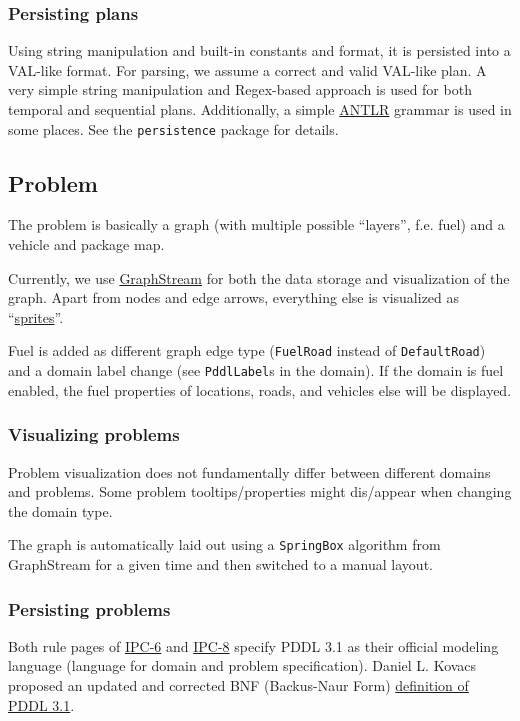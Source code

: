 \subsubsection*{Persisting plans}
Using string manipulation and built-in constants and format, it is persisted into a VAL-like format.
For parsing, we assume a correct and valid VAL-like plan. A very simple string manipulation and Regex-based approach
is used for both temporal and sequential plans. Additionally, a simple \href{http://www.antlr.org/}{ANTLR} grammar
is used in some places. See the \texttt{persistence} package for details.

\subsection*{Problem}
The problem is basically a graph (with multiple possible ``layers'', f.e. fuel) and a vehicle and package map.

Currently, we use \href{http://graphstream-project.org/}{GraphStream} for both the data storage and visualization of the graph.
Apart from nodes and edge arrows, everything else is visualized as
``\href{http://graphstream-project.org/doc/Tutorials/Graph-Visualisation/#sprites}{sprites}''.

Fuel is added as different graph edge type (\verb+FuelRoad+ instead of \verb+DefaultRoad+) and a domain label change
(see \verb+PddlLabel+s in the domain).
If the domain is fuel enabled, the fuel properties of locations, roads, and vehicles else will be displayed.

\subsubsection*{Visualizing problems}

Problem visualization does not fundamentally differ between different domains and problems.
Some problem tooltips/properties might dis/appear when changing the domain type.

The graph is automatically laid out using a \texttt{SpringBox} algorithm from GraphStream
for a given time and then switched to a manual layout.

\subsubsection*{Persisting problems}
Both rule pages of \href{http://icaps-conference.org/ipc2008/deterministic/CompetitionRules.html}{IPC-6}
and \href{https://helios.hud.ac.uk/scommv/IPC-14/rules.html}{IPC-8}
specify PDDL 3.1 as their official modeling language (language for domain
and problem specification).
Daniel L. Kovacs proposed an updated and corrected BNF (Backus-Naur Form)
\href{https://helios.hud.ac.uk/scommv/IPC-14/repository/kovacs-pddl-3.1-2011.pdf}{definition of PDDL 3.1}.

